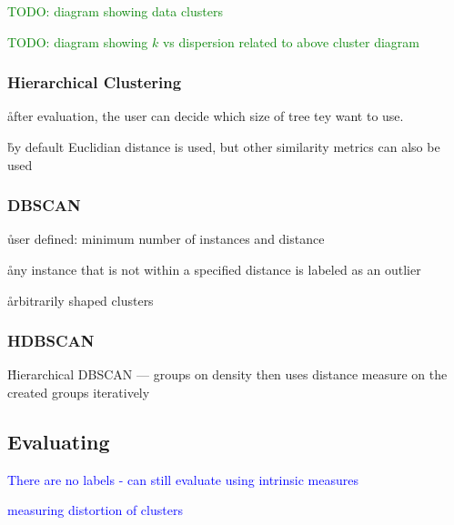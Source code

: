 \textcolor{green}{TODO: diagram showing data clusters}

\textcolor{green}{TODO: diagram showing $k$ vs dispersion related to above cluster diagram}



\subsubsection{Hierarchical Clustering}



\r{after evaluation, the user can decide which size of tree tey want to use.}

\r{by default Euclidian distance is used, but other similarity metrics can also be used }



\subsubsection{DBSCAN}


\r{user defined: minimum number of instances and distance}

\r{any instance that is not within a specified distance is labeled as an outlier}

\r{arbitrarily shaped clusters}

\subsubsection{HDBSCAN}

\r{Hierarchical DBSCAN --- groups on density then uses distance measure on the created groups iteratively}


\subsection{Evaluating}

\textcolor{blue}{There are no labels - can still evaluate using intrinsic measures}

\textcolor{blue}{measuring distortion of clusters}

